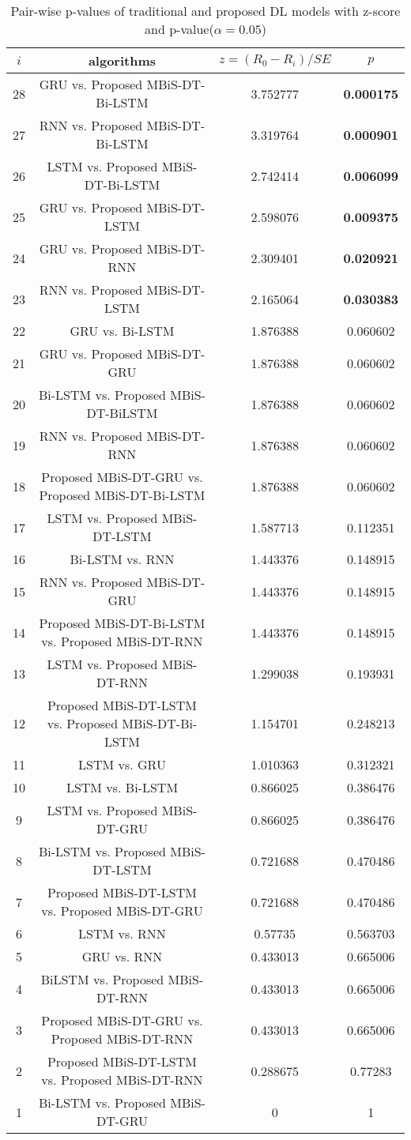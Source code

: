 \begin{table}[!htbp]
\centering\scriptsize
    \setlength{\tabcolsep}{3pt}
    {\renewcommand{\arraystretch}{1}%

\caption{Pair-wise p-values of traditional and proposed DL models with z-score and p-value($\alpha=0.05$)}
\label{tabpvalue}
\begin{tabular}{cccc}
\hline
$i$&algorithms&$z=(R_0 - R_i)/SE$&$p$\\
\hline28&GRU vs. Proposed MBiS-DT-Bi-LSTM&3.752777&\textbf{0.000175}\\
27&RNN vs. Proposed MBiS-DT-Bi-LSTM&3.319764&\textbf{0.000901}\\
26&LSTM vs. Proposed MBiS-DT-Bi-LSTM&2.742414&\textbf{0.006099}\\
25&GRU vs. Proposed MBiS-DT-LSTM&2.598076&\textbf{0.009375}\\
24&GRU vs. Proposed MBiS-DT-RNN&2.309401&\textbf{0.020921}\\
23&RNN vs. Proposed MBiS-DT-LSTM&2.165064&\textbf{0.030383}\\
22&GRU vs. Bi-LSTM&1.876388&0.060602\\
21&GRU vs. Proposed MBiS-DT-GRU&1.876388&0.060602\\
20&Bi-LSTM vs. Proposed MBiS-DT-BiLSTM&1.876388&0.060602\\
19&RNN vs. Proposed MBiS-DT-RNN&1.876388&0.060602\\
18&Proposed MBiS-DT-GRU vs. Proposed MBiS-DT-Bi-LSTM&1.876388&0.060602\\
17&LSTM vs. Proposed MBiS-DT-LSTM&1.587713&0.112351\\
16&Bi-LSTM vs. RNN&1.443376&0.148915\\
15&RNN vs. Proposed MBiS-DT-GRU&1.443376&0.148915\\
14&Proposed MBiS-DT-Bi-LSTM vs. Proposed MBiS-DT-RNN&1.443376&0.148915\\
13&LSTM vs. Proposed MBiS-DT-RNN&1.299038&0.193931\\
12&Proposed MBiS-DT-LSTM vs. Proposed MBiS-DT-Bi-LSTM&1.154701&0.248213\\
11&LSTM vs. GRU&1.010363&0.312321\\
10&LSTM vs. Bi-LSTM&0.866025&0.386476\\
9&LSTM vs. Proposed MBiS-DT-GRU&0.866025&0.386476\\
8&Bi-LSTM vs. Proposed MBiS-DT-LSTM&0.721688&0.470486\\
7&Proposed MBiS-DT-LSTM vs. Proposed MBiS-DT-GRU&0.721688&0.470486\\
6&LSTM vs. RNN&0.57735&0.563703\\
5&GRU vs. RNN&0.433013&0.665006\\
4&BiLSTM vs. Proposed MBiS-DT-RNN&0.433013&0.665006\\
3&Proposed MBiS-DT-GRU vs. Proposed MBiS-DT-RNN&0.433013&0.665006\\
2&Proposed MBiS-DT-LSTM vs. Proposed MBiS-DT-RNN&0.288675&0.77283\\
1&Bi-LSTM vs. Proposed MBiS-DT-GRU&0&1\\
\hline
\end{tabular}%
}
\end{table}
\pagebreak
